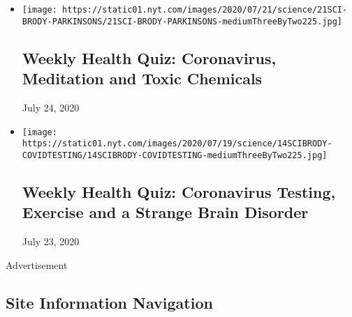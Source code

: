 \begin{itemize}
\item
  \href{https://www.nytimes.com/interactive/2020/07/24/well/live/24healthquiz-07242020.html}{}

  \texttt{[image: https://static01.nyt.com/images/2020/07/21/science/21SCI-BRODY-PARKINSONS/21SCI-BRODY-PARKINSONS-mediumThreeByTwo225.jpg]}

  \hypertarget{weekly-health-quiz-coronavirus-meditation-and-toxic-chemicals}{%
  \subsection{Weekly Health Quiz: Coronavirus, Meditation and Toxic
  Chemicals}\label{weekly-health-quiz-coronavirus-meditation-and-toxic-chemicals}}

  July 24, 2020
\item
  \href{https://www.nytimes.com/interactive/2020/07/17/well/live/17healthquiz-07172020.html}{}

  \texttt{[image: https://static01.nyt.com/images/2020/07/19/science/14SCIBRODY-COVIDTESTING/14SCIBRODY-COVIDTESTING-mediumThreeByTwo225.jpg]}

  \hypertarget{weekly-health-quiz-coronavirus-testing-exercise-and-a-strange-brain-disorder}{%
  \subsection{Weekly Health Quiz: Coronavirus Testing, Exercise and a
  Strange Brain
  Disorder}\label{weekly-health-quiz-coronavirus-testing-exercise-and-a-strange-brain-disorder}}

  July 23, 2020
\end{itemize}

Advertisement

\hypertarget{site-information-navigation}{%
\subsection{Site Information
Navigation}\label{site-information-navigation}}

